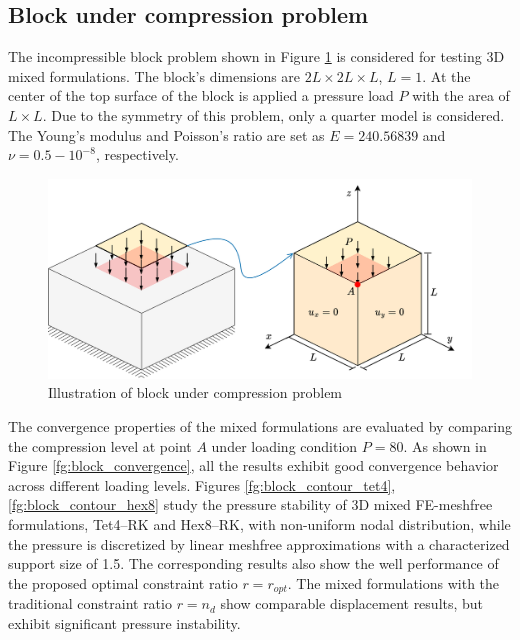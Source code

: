 \subsection{Block under compression problem}
The incompressible block problem \cite{reese2000} shown in Figure \ref{fg:block_model} is considered for testing 3D mixed formulations. The block's dimensions are $2L\times 2L \times L$, $L=1$.
At the center of the top surface of the block is applied a pressure load $P$ with the area of $L\times L$.
Due to the symmetry of this problem, only a quarter model is considered.
The Young's modulus and Poisson's ratio are set as $E = 240.56839$ and $\nu = 0.5-10^{-8}$, respectively.

\begin{figure}[H]
\centering
\includegraphics[width=\textwidth]{png/block_model_r1.png}
\caption{Illustration of block under compression problem}\label{fg:block_model}
\end{figure}

The convergence properties of the mixed formulations are evaluated by comparing the compression level at point $A$ under loading condition $P = 80$.
As shown in Figure \ref{fg:block_convergence}, all the results exhibit good convergence behavior across different loading levels.
Figures \ref{fg:block_contour_tet4}, \ref{fg:block_contour_hex8} study the pressure stability of 3D mixed FE-meshfree formulations, Tet4--RK and Hex8--RK, with non-uniform nodal distribution, while the pressure is discretized by linear meshfree approximations with a characterized support size of 1.5. The corresponding results also show the well performance of the proposed optimal constraint ratio $r=r_{opt}$. The mixed formulations with the traditional constraint ratio $r=n_d$ show comparable displacement results, but exhibit significant pressure instability.

